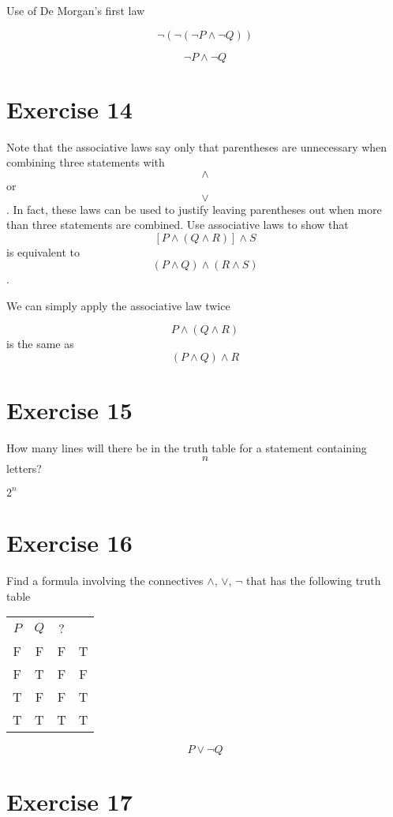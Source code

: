 \documentclass[11pt]{article}
\begin{document}
Use of De Morgan's first law

$$\neg(\neg(\neg P \wedge \neg Q))$$

$$\neg P \wedge \neg Q$$


\section*{Exercise 14}

Note that the associative laws say only that parentheses are unnecessary
when combining three statements with $$\wedge$$ or $$\vee$$. In fact, these laws can be
used to justify leaving parentheses out when more than three statements
are combined. Use associative laws to show that $$[P \wedge (Q \wedge R)] \wedge S$$ is
equivalent to $$(P \wedge Q) \wedge (R \wedge S)$$.

We can simply apply the associative law twice

$$P \wedge (Q \wedge R)$$ is the same as $$(P \wedge Q) \wedge R$$


\section*{Exercise 15}

How many lines will there be in the truth table for a statement containing $$n$$ letters?

$2^n$

\section*{Exercise 16}

Find a formula involving the connectives $\wedge$, $\vee$, $\neg$ that has the following truth table

\begin{center}
\begin{tabular}{ c c c c }
 $P$ & $Q$ & ?\\ 
F & F & F & T\\  
F & T & F & F\\
T & F & F & T\\  
T & T & T & T
\end{tabular}
\end{center}

$$P \vee \neg Q$$

\section*{Exercise 17}
\end{document}
